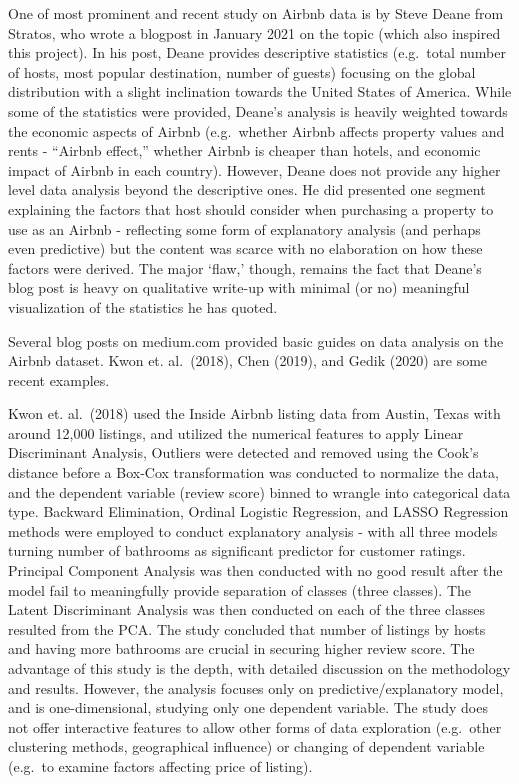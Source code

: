 \documentclass{acm_proc_article-sp}
\begin{document}
One of most prominent and recent study on Airbnb data is by Steve Deane
from Stratos, who wrote a blogpost in January 2021 on the topic (which
also inspired this project). In his post, Deane provides descriptive
statistics (e.g.~total number of hosts, most popular destination, number
of guests) focusing on the global distribution with a slight inclination
towards the United States of America. While some of the statistics were
provided, Deane's analysis is heavily weighted towards the economic
aspects of Airbnb (e.g.~whether Airbnb affects property values and rents
- ``Airbnb effect,'' whether Airbnb is cheaper than hotels, and economic
impact of Airbnb in each country). However, Deane does not provide any
higher level data analysis beyond the descriptive ones. He did presented
one segment explaining the factors that host should consider when
purchasing a property to use as an Airbnb - reflecting some form of
explanatory analysis (and perhaps even predictive) but the content was
scarce with no elaboration on how these factors were derived. The major
`flaw,' though, remains the fact that Deane's blog post is heavy on
qualitative write-up with minimal (or no) meaningful visualization of
the statistics he has quoted.

Several blog posts on medium.com provided basic guides on data analysis
on the Airbnb dataset. Kwon et. al.~(2018), Chen (2019), and Gedik
(2020) are some recent examples.

Kwon et. al.~(2018) used the Inside Airbnb listing data from Austin,
Texas with around 12,000 listings, and utilized the numerical features
to apply Linear Discriminant Analysis, Outliers were detected and
removed using the Cook's distance before a Box-Cox transformation was
conducted to normalize the data, and the dependent variable (review
score) binned to wrangle into categorical data type. Backward
Elimination, Ordinal Logistic Regression, and LASSO Regression methods
were employed to conduct explanatory analysis - with all three models
turning number of bathrooms as significant predictor for customer
ratings. Principal Component Analysis was then conducted with no good
result after the model fail to meaningfully provide separation of
classes (three classes). The Latent Discriminant Analysis was then
conducted on each of the three classes resulted from the PCA. The study
concluded that number of listings by hosts and having more bathrooms are
crucial in securing higher review score. The advantage of this study is
the depth, with detailed discussion on the methodology and results.
However, the analysis focuses only on predictive/explanatory model, and
is one-dimensional, studying only one dependent variable. The study does
not offer interactive features to allow other forms of data exploration
(e.g.~other clustering methods, geographical influence) or changing of
dependent variable (e.g.~to examine factors affecting price of listing).
\end{document}
